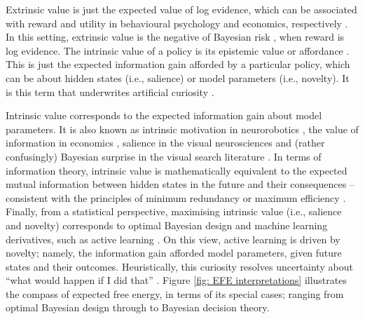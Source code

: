 \documentclass[review,12pt,authoryear]{elsarticle}
\begin{document}
Extrinsic value is just the expected value of log evidence, which can be associated with reward and utility in behavioural psychology and economics, respectively \citep{bartoNoveltySurprise2013,kauderGenesisMarginalUtility1953,schmidhuberFormalTheoryCreativity2010}. In this setting, extrinsic value is the negative of Bayesian risk \citep{bergerStatisticalDecisionTheory1985}, when reward is log evidence. The intrinsic value of a policy is its epistemic value or affordance \citep{fristonActiveInferenceEpistemic2015}. This is just the expected information gain afforded by a particular policy, which can be about hidden states (i.e., salience) or model parameters (i.e., novelty). It is this term that underwrites artificial curiosity \citep{schmidhuberDevelopmentalRoboticsOptimal2006}.

Intrinsic value corresponds to the expected information gain about model parameters. It is also known as intrinsic motivation in neurorobotics \citep{bartoNoveltySurprise2013,oudeyerWhatIntrinsicMotivation2009,deciIntrinsicMotivationSelfDetermination1985}, the value of information in economics \citep{howardInformationValueTheory1966}, salience in the visual neurosciences and (rather confusingly) Bayesian surprise in the visual search literature \citep{ittiBayesianSurpriseAttracts2009,schwartenbeckExplorationNoveltySurprise2013,sunPlanningBeSurprised2011}. In terms of information theory, intrinsic value is mathematically equivalent to the expected mutual information between hidden states in the future and their consequences – consistent with the principles of minimum redundancy or maximum efficiency \citep{barlowPossiblePrinciplesUnderlying1961,barlowInductiveInferenceCoding1974,linskerPerceptualNeuralOrganization1990}. Finally, from a statistical perspective, maximising intrinsic value (i.e., salience and novelty) corresponds to optimal Bayesian design \citep{lindleyMeasureInformationProvided1956} and machine learning derivatives, such as active learning \citep{mackayInformationBasedObjectiveFunctions1992}. On this view, active learning is driven by novelty; namely, the information gain afforded model parameters, given future states and their outcomes. Heuristically, this curiosity resolves uncertainty about “what would happen if I did that” \citep{schmidhuberFormalTheoryCreativity2010}. Figure \ref{fig: EFE interpretations} illustrates the compass of expected free energy, in terms of its special cases; ranging from optimal Bayesian design through to Bayesian decision theory.
\end{document}
